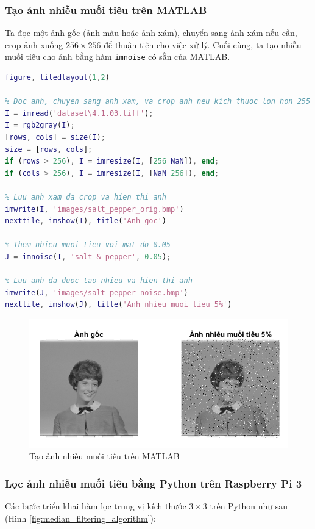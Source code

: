 \subsubsection{Tạo ảnh nhiễu muối tiêu trên MATLAB}

Ta đọc một ảnh gốc (ảnh màu hoặc ảnh xám), chuyển sang ảnh xám nếu cần, crop ảnh xuống $256 \times 256$ để thuận tiện cho việc xử lý. Cuối cùng, ta tạo nhiễu muối tiêu cho ảnh bằng hàm \texttt{imnoise} có sẵn của MATLAB.

\begin{lstlisting}[language=MATLAB]
figure, tiledlayout(1,2)

% Doc anh, chuyen sang anh xam, va crop anh neu kich thuoc lon hon 255
I = imread('dataset\4.1.03.tiff');
I = rgb2gray(I);
[rows, cols] = size(I);
size = [rows, cols];
if (rows > 256), I = imresize(I, [256 NaN]), end;
if (cols > 256), I = imresize(I, [NaN 256]), end;

% Luu anh xam da crop va hien thi anh
imwrite(I, 'images/salt_pepper_orig.bmp')
nexttile, imshow(I), title('Anh goc')

% Them nhieu muoi tieu voi mat do 0.05
J = imnoise(I, 'salt & pepper', 0.05);

% Luu anh da duoc tao nhieu va hien thi anh
imwrite(J, 'images/salt_pepper_noise.bmp')
nexttile, imshow(J), title('Anh nhieu muoi tieu 5%')
\end{lstlisting}

\begin{figure}[H]
    \centering
    \includegraphics[width=.75\linewidth]{images/salt_pepper_noise_matlab.png}
    \caption{Tạo ảnh nhiễu muối tiêu trên MATLAB}
\end{figure}

\subsubsection{Lọc ảnh nhiễu muối tiêu bằng Python trên Raspberry Pi 3}

Các bước triển khai hàm lọc trung vị kích thước $3 \times 3$ trên Python như sau (Hình \ref{fig:median_filtering_algorithm}):

